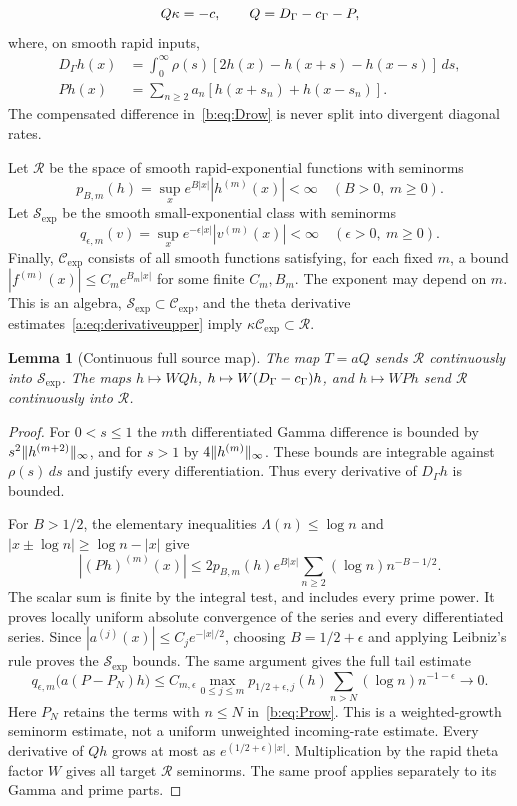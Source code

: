 \documentclass[11pt,a4paper]{article}
\numberwithin{equation}{section}
\newtheorem{lemma}[theorem]{Lemma}
\theoremstyle{definition}\newtheorem{definition}[theorem]{Definition}
\theoremstyle{remark}\newtheorem{remark}[theorem]{Remark}
\newcommand{\RR}{\mathscr R}\newcommand{\SSS}{\mathcal S_{\!\exp}}\newcommand{\CE}{\mathcal C_{\exp}}
\begin{document}
\begin{equation}\label{b:eq:source-main}
 Q\kappa=-c,\qquad Q=D_\Gamma-c_\Gamma-P,
\end{equation}
where, on smooth rapid inputs,
\begin{align}
 D_\Gamma h(x)&=\int_0^\infty\rho(s)
       [2h(x)-h(x+s)-h(x-s)]\,ds,\label{b:eq:Drow}\\
 Ph(x)&=\sum_{n\ge2}a_n[h(x+s_n)+h(x-s_n)].\label{b:eq:Prow}
\end{align}
The compensated difference in~\eqref{b:eq:Drow} is never split into divergent diagonal rates.

Let $\RR$ be the space of smooth rapid-exponential functions with seminorms
\[
 p_{B,m}(h)=\sup_x e^{B|x|}|h^{(m)}(x)|<\infty
 \quad(B>0,\ m\ge0).
\]
Let $\SSS$ be the smooth small-exponential class with seminorms
\[
 q_{\epsilon,m}(v)=\sup_xe^{-\epsilon|x|}|v^{(m)}(x)|<\infty
 \quad(\epsilon>0,\ m\ge0).
\]
Finally, $\CE$ consists of all smooth functions satisfying, for each fixed $m$, a bound $|f^{(m)}(x)|\le C_m e^{B_m|x|}$ for some finite $C_m,B_m$. The exponent may depend on $m$. This is an algebra, $\SSS\subset\CE$, and the theta derivative estimates~\eqref{a:eq:derivativeupper} imply $\kappa\CE\subset\RR$.

\begin{lemma}[Continuous full source map]\label{b:lem:T}
The map $T=aQ$ sends $\RR$ continuously into $\SSS$. The maps $h\mapsto WQh$, $h\mapsto W(D_\Gamma-c_\Gamma)h$, and $h\mapsto WPh$ send $\RR$ continuously into $\RR$.
\end{lemma}
\begin{proof}
For $0<s\le1$ the $m$th differentiated Gamma difference is bounded by $s^2\lVert h^{(m+2)}\rVert_\infty$, and for $s>1$ by $4\lVert h^{(m)}\rVert_\infty$. These bounds are integrable against $\rho(s)\,ds$ and justify every differentiation. Thus every derivative of $D_\Gamma h$ is bounded.

For $B>1/2$, the elementary inequalities $\Lambda(n)\le\log n$ and $|x\pm\log n|\ge\log n-|x|$ give
\begin{equation}\label{b:eq:primepoint}
 |(Ph)^{(m)}(x)|\le
  2p_{B,m}(h)e^{B|x|}\sum_{n\ge2}(\log n)n^{-B-1/2}.
\end{equation}
The scalar sum is finite by the integral test, and includes every prime power. It proves locally uniform absolute convergence of the series and every differentiated series. Since $|a^{(j)}(x)|\le C_j e^{-|x|/2}$, choosing $B=1/2+\epsilon$ and applying Leibniz's rule proves the $\SSS$ bounds. The same argument gives the full tail estimate
\begin{equation}\label{b:eq:primetailpoint}
 q_{\epsilon,m}\bigl(a(P-P_N)h\bigr)
 \le C_{m,\epsilon}\max_{0\le j\le m}p_{1/2+\epsilon,j}(h)
           \sum_{n>N}(\log n)n^{-1-\epsilon}\longrightarrow0.
\end{equation}
Here $P_N$ retains the terms with $n\le N$ in~\eqref{b:eq:Prow}. This is a weighted-growth seminorm estimate, not a uniform unweighted incoming-rate estimate. Every derivative of $Qh$ grows at most as $e^{(1/2+\epsilon)|x|}$. Multiplication by the rapid theta factor $W$ gives all target $\RR$ seminorms. The same proof applies separately to its Gamma and prime parts.
\end{proof}
\end{document}

